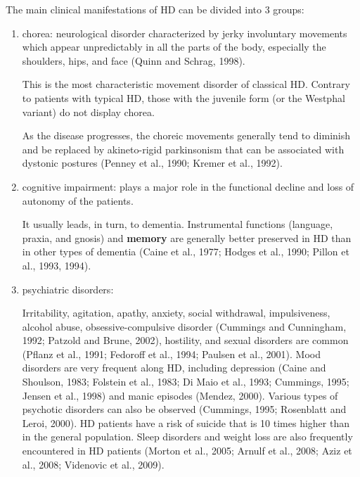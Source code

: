 


The main clinical manifestations of HD can be divided into 3 groups:
\begin{enumerate}
  \item chorea: neurological disorder characterized by jerky involuntary
  movements which appear unpredictably in all the parts of the body, 
  especially the shoulders, hips, and face (Quinn and Schrag, 1998).
  
  This is the most characteristic movement disorder of classical HD.
  Contrary to patients with typical HD, those with the juvenile form (or the
  Westphal variant) do not display chorea.
  
  As the disease progresses, the choreic movements generally tend to diminish
  and be replaced by akineto-rigid parkinsonism that can be associated with
  dystonic postures  (Penney et al., 1990; Kremer et al., 1992).
  
  \item cognitive impairment: plays a major role in the functional decline and
  loss of autonomy of the patients. 
  
  It usually leads, in turn, to dementia.
  Instrumental functions (language, praxia, and gnosis) and {\bf memory} are
  generally better preserved in HD than in other types of dementia (Caine et
  al., 1977; Hodges et al., 1990; Pillon et al., 1993, 1994).
  
  \item psychiatric disorders:
  
  Irritability, agitation, apathy, anxiety, social withdrawal, impulsiveness,
  alcohol abuse, obsessive-compulsive disorder (Cummings and Cunningham, 1992;
  Patzold and Brune, 2002), hostility, and sexual disorders are common (Pflanz
  et al., 1991; Fedoroff et al., 1994; Paulsen et al., 2001). Mood disorders are
  very frequent along HD, including depression (Caine and Shoulson, 1983;
  Folstein et al., 1983; Di Maio et al., 1993; Cummings, 1995; Jensen et al.,
  1998) and manic episodes (Mendez, 2000). Various types of psychotic disorders
  can also be observed (Cummings, 1995; Rosenblatt and Leroi, 2000). HD patients
  have a risk of suicide that is 10 times higher than in the general population.
  Sleep disorders and weight loss are also frequently encountered in HD patients
  (Morton et al., 2005; Arnulf et al., 2008; Aziz et al., 2008; Videnovic et
  al., 2009).
\end{enumerate}


